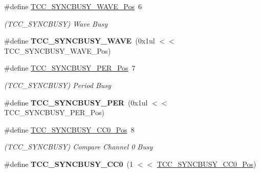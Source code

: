 \begin{DoxyCompactItemize}
\item 
\hypertarget{group___s_a_m_l21___t_c_c_gae18df2072d304dd2c12a6bf641cb16f6}{}\#define \hyperlink{group___s_a_m_l21___t_c_c_gae18df2072d304dd2c12a6bf641cb16f6}{T\+C\+C\+\_\+\+S\+Y\+N\+C\+B\+U\+S\+Y\+\_\+\+W\+A\+V\+E\+\_\+\+Pos}~6\label{group___s_a_m_l21___t_c_c_gae18df2072d304dd2c12a6bf641cb16f6}

\begin{DoxyCompactList}\small\item\em (T\+C\+C\+\_\+\+S\+Y\+N\+C\+B\+U\+S\+Y) Wave Busy \end{DoxyCompactList}\item 
\hypertarget{group___s_a_m_l21___t_c_c_ga5a7ef2077a4a2ff25e72ae77e04652bf}{}\#define {\bfseries T\+C\+C\+\_\+\+S\+Y\+N\+C\+B\+U\+S\+Y\+\_\+\+W\+A\+V\+E}~(0x1ul $<$$<$ T\+C\+C\+\_\+\+S\+Y\+N\+C\+B\+U\+S\+Y\+\_\+\+W\+A\+V\+E\+\_\+\+Pos)\label{group___s_a_m_l21___t_c_c_ga5a7ef2077a4a2ff25e72ae77e04652bf}

\item 
\hypertarget{group___s_a_m_l21___t_c_c_ga70908b2744b3bd3420a4fa7bfd78770a}{}\#define \hyperlink{group___s_a_m_l21___t_c_c_ga70908b2744b3bd3420a4fa7bfd78770a}{T\+C\+C\+\_\+\+S\+Y\+N\+C\+B\+U\+S\+Y\+\_\+\+P\+E\+R\+\_\+\+Pos}~7\label{group___s_a_m_l21___t_c_c_ga70908b2744b3bd3420a4fa7bfd78770a}

\begin{DoxyCompactList}\small\item\em (T\+C\+C\+\_\+\+S\+Y\+N\+C\+B\+U\+S\+Y) Period Busy \end{DoxyCompactList}\item 
\hypertarget{group___s_a_m_l21___t_c_c_ga5d0675729a419626fa502801e3c74388}{}\#define {\bfseries T\+C\+C\+\_\+\+S\+Y\+N\+C\+B\+U\+S\+Y\+\_\+\+P\+E\+R}~(0x1ul $<$$<$ T\+C\+C\+\_\+\+S\+Y\+N\+C\+B\+U\+S\+Y\+\_\+\+P\+E\+R\+\_\+\+Pos)\label{group___s_a_m_l21___t_c_c_ga5d0675729a419626fa502801e3c74388}

\item 
\hypertarget{group___s_a_m_l21___t_c_c_ga6ecd9ec9747ae848da746cf57bf71aa7}{}\#define \hyperlink{group___s_a_m_l21___t_c_c_ga6ecd9ec9747ae848da746cf57bf71aa7}{T\+C\+C\+\_\+\+S\+Y\+N\+C\+B\+U\+S\+Y\+\_\+\+C\+C0\+\_\+\+Pos}~8\label{group___s_a_m_l21___t_c_c_ga6ecd9ec9747ae848da746cf57bf71aa7}

\begin{DoxyCompactList}\small\item\em (T\+C\+C\+\_\+\+S\+Y\+N\+C\+B\+U\+S\+Y) Compare Channel 0 Busy \end{DoxyCompactList}\item 
\hypertarget{group___s_a_m_l21___t_c_c_ga0d41c387802fb0cd04acc14c9cfdc201}{}\#define {\bfseries T\+C\+C\+\_\+\+S\+Y\+N\+C\+B\+U\+S\+Y\+\_\+\+C\+C0}~(1 $<$$<$ \hyperlink{group___s_a_m_l21___t_c_c_ga6ecd9ec9747ae848da746cf57bf71aa7}{T\+C\+C\+\_\+\+S\+Y\+N\+C\+B\+U\+S\+Y\+\_\+\+C\+C0\+\_\+\+Pos})\label{group___s_a_m_l21___t_c_c_ga0d41c387802fb0cd04acc14c9cfdc201}


\end{DoxyCompactItemize}
